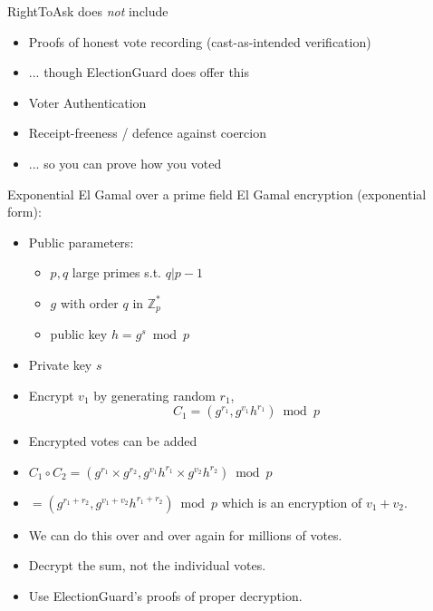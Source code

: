 \documentclass[10pt,xcolor=svgnames,169]{beamer} %
\begin{document}
%	

\begin{frame}
	RightToAsk does \emph{not} include
	
\begin{itemize}
	\item Proofs of honest vote recording (cast-as-intended verification)

\item ... though ElectionGuard does offer this
\item Voter Authentication
\item Receipt-freeness / defence against coercion 
\item ... so you can prove how you voted 
\end{itemize}
\end{frame}
	\begin{frame}[fragile]{Exponential El Gamal over a prime field}
	El Gamal encryption (exponential form):
	
	\begin{itemize}
		\item Public parameters: 
			\begin{itemize}
				\item $p,q$ large primes s.t. $q | p-1$ 
				\item $g$ with order $q$ in $\mathbb{Z}^*_p$
				\item public key $h = g^s \bmod p$
			\end{itemize}
		\item Private key $s$
		\item \pause Encrypt $v_1$ by generating random $r_1$,
			 $$C_1 = (g^{r_1}, g^{v_1} h^{r_1})  \bmod p $$
		\item \pause Encrypted votes can be added
		\item \pause $C_1 \circ C_2 = (g^{r_1} \times g^{r_2} , g^{v_1} h^{r_1} \times g^{v_2} h^{r_2} ) \bmod p $ 
		\item \pause $ = (g^{r_1+r_2} , g^{v_1+v_2} h^{r_1+r_2} ) \bmod p $ which is an encryption of $v_1 + v_2$.
		\item \pause We can do this over and over again for millions of votes.
		\item \pause Decrypt the sum, not the individual votes.
		\item \pause Use ElectionGuard's proofs of proper decryption.
	\end{itemize}	
		
	\end{frame}
\end{document}
